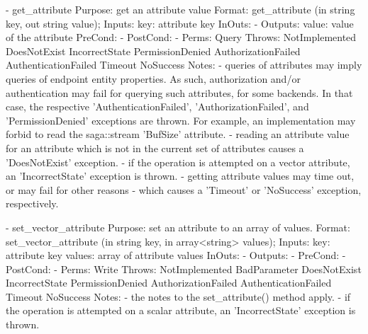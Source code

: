 \begin{myspec}
 
    - get_attribute
      Purpose:  get an attribute value
      Format:   get_attribute        (in  string key,
                                      out string value);
      Inputs:   key:                  attribute key
      InOuts:   -
      Outputs:  value:                value of the attribute
      PreCond:  -
      PostCond: -
      Perms:    Query
      Throws:   NotImplemented
                DoesNotExist
                IncorrectState
                PermissionDenied
                AuthorizationFailed
                AuthenticationFailed
                Timeout
                NoSuccess
      Notes:    - queries of attributes may imply queries of
                  endpoint entity properties.  As such,
                  authorization and/or authentication may fail
                  for querying such attributes, for some
                  backends.  In that case, the respective
                  'AuthenticationFailed', 'AuthorizationFailed',
                  and 'PermissionDenied' exceptions are thrown.
                  For example, an implementation may forbid to
                  read the saga::stream 'BufSize' attribute.
                - reading an attribute value for an attribute
                  which is not in the current set of attributes
                  causes a 'DoesNotExist' exception.
                - if the operation is attempted on a vector
                  attribute, an 'IncorrectState' exception is
                  thrown.
                - getting attribute values may time out, or may 
                  fail for other reasons - which causes a 
                  'Timeout' or 'NoSuccess' exception, 
                  respectively.
 
 
    - set_vector_attribute
      Purpose:  set an attribute to an array of values.
      Format:   set_vector_attribute (in string          key,
                                      in array<string>   values);
      Inputs:   key:                  attribute key
                values:               array of attribute values
      InOuts:   -
      Outputs:  -
      PreCond:  -
      PostCond: -
      Perms:    Write
      Throws:   NotImplemented
                BadParameter
                DoesNotExist
                IncorrectState
                PermissionDenied
                AuthorizationFailed
                AuthenticationFailed
                Timeout
                NoSuccess
      Notes:    - the notes to the set_attribute() method apply.
                - if the operation is attempted on a scalar
                  attribute, an 'IncorrectState' exception is
                  thrown.
 

\end{myspec}
